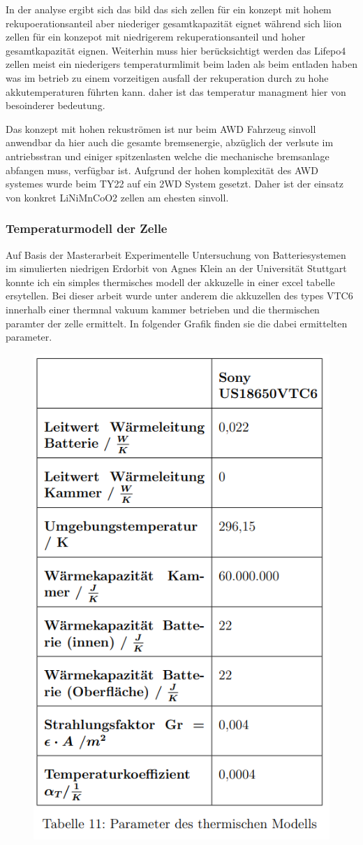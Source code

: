 In der analyse ergibt sich das bild das sich  zellen für ein konzept mit hohem rekupoerationsanteil aber niederiger gesamtkapazität eignet während sich liion zellen für ein konzepot mit niedrigerem rekuperationsanteil und hoher gesamtkapazität eignen. Weiterhin muss hier berücksichtigt werden das Lifepo4 zellen meist ein niederigers temperaturmlimit beim laden als beim entladen haben was im betrieb zu einem vorzeitigen ausfall der rekuperation durch zu hohe akkutemperaturen führten kann. daher ist das temperatur managment hier von besoinderer bedeutung.

Das konzept mit hohen rekuströmen ist nur beim AWD Fahrzeug sinvoll anwendbar da hier auch die gesamte bremsenergie, abzüglich der verlsute im antriebsstran und einiger spitzenlasten welche die mechanische bremsanlage abfangen muss, verfügbar ist. Aufgrund der hohen komplexität des AWD systemes wurde beim TY22 auf ein 2WD System gesetzt. Daher ist der einsatz von konkret LiNiMnCoO2 zellen am ehesten sinvoll.

\subsubsection{Temperaturmodell der Zelle}

Auf Basis der Masterarbeit Experimentelle Untersuchung von Batteriesystemen im simulierten niedrigen Erdorbit von Agnes Klein an der Universität Stuttgart konnte ich ein simples thermisches modell der akkuzelle in einer excel tabelle ersytellen. Bei dieser arbeit wurde unter anderem die akkuzellen des types VTC6 innerhalb einer thermnal vakuum kammer betrieben und die thermischen paramter der zelle ermittelt. In folgender Grafik finden sie die dabei ermittelten parameter.

\begin{figure}[h]
	\centering
	\includegraphics[width=0.4\linewidth]{bilder/Parameter_thermisches_modell_VTC6}
	\caption{}
	\label{fig:parameterthermischesmodellvtc6}
\end{figure}


